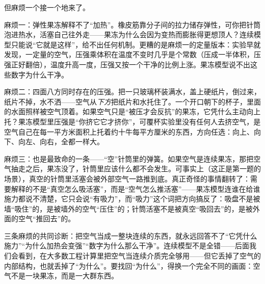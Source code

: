 但麻烦一个接一个地来了。

麻烦一：弹性果冻解释不了“加热”。橡皮筋靠分子间的拉力储存弹性，可你把针筒泡进热水，活塞自己往外走——果冻为什么会因为变热而膨胀得更想顶人？连续模型只能说“它就是这样”，给不出任何机制。更糟的是麻烦一的定量版本：实验早就发现，一定量的空气，压强乘体积在温度不变时几乎是个常数（压成一半体积，压强正好翻倍），温度升高一度，压强又按一个干净的比例上涨。果冻模型说不出这些数字为什么干净。

麻烦二：四面八方同时存在的压强。把一只玻璃杯装满水，盖上硬纸片，倒过来，纸片不掉，水不洒——空气从\emph{下方}把纸片和水托住了。一个开口朝下的杯子，里面的水面照样被空气顶着。如果空气只是“被压才会反抗”的果冻，它凭什么主动向上托？果冻模型里压强是“你挤它它才挤你”，可覆杯实验里没有任何人去挤空气，是空气自己在每一平方米面积上托着约十牛每平方厘米的东西，方向任选：向上、向下、向左、向右，全都一样大。

麻烦三：也是最致命的一条——“空”针筒里的弹簧。如果空气是连续果冻，那把空气抽走之后，果冻没了，针筒里应该什么都不会发生。可事实上（这正是第一题的场景），真空的针筒里活塞会被外部空气一路推到底。真正奇怪的事情翻转了：需要解释的不是“真空怎么吸活塞”，而是“空气怎么推活塞”——果冻模型连谁在给谁施力都说不清楚，它只会说“有吸力”，而“吸力”这个词把方向搞反了：吸盘不是被墙“吸住”的，是被墙外的空气“压住”的；针筒活塞不是被真空“吸回去”的，是被外面的空气“推回去”的。

三条麻烦的共同诊断：把空气当成一整块连续的东西，就永远回答不了“它凭什么施力”“为什么加热会变强”“数字为什么那么干净”。连续模型不是全错——后面我们会看到，在大多数工程计算里把空气当连续介质完全够用——但它丢掉了空气的内部结构，也就丢掉了“为什么”。要找回“为什么”，得换一个完全不同的画面：空气不是一块果冻，而是一大群东西。


